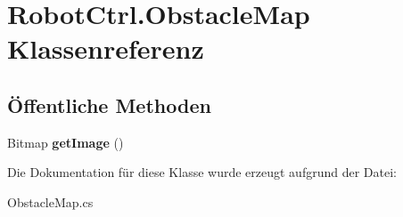 \hypertarget{class_robot_ctrl_1_1_obstacle_map}{
\section{RobotCtrl.ObstacleMap Klassenreferenz}
\label{class_robot_ctrl_1_1_obstacle_map}
}
\subsection*{Öffentliche Methoden}
\begin{DoxyCompactItemize}
\item 
\hypertarget{class_robot_ctrl_1_1_obstacle_map_a6331e9073a17ee26ba3e272f4f20122f}{
Bitmap {\bfseries getImage} ()}
\label{class_robot_ctrl_1_1_obstacle_map_a6331e9073a17ee26ba3e272f4f20122f}

\end{DoxyCompactItemize}


Die Dokumentation für diese Klasse wurde erzeugt aufgrund der Datei:\begin{DoxyCompactItemize}
\item 
ObstacleMap.cs\end{DoxyCompactItemize}
